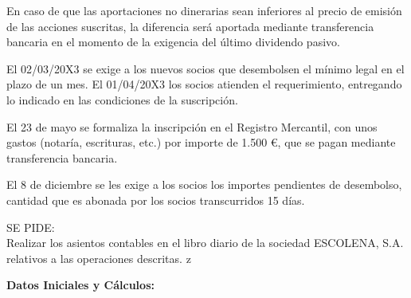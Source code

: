 En caso de que las aportaciones no dinerarias sean inferiores al precio
de emisión de las acciones suscritas, la diferencia será aportada
mediante transferencia bancaria en el momento de la exigencia del último
dividendo pasivo.

El 02/03/20X3 se exige a los nuevos socios que desembolsen el mínimo
legal en el plazo de un mes. El 01/04/20X3 los socios atienden el
requerimiento, entregando lo indicado en las condiciones de la
suscripción.

El 23 de mayo se formaliza la inscripción en el Registro Mercantil, con
unos gastos (notaría, escrituras, etc.) por importe de 1.500 €, que se
pagan mediante transferencia bancaria.

El 8 de diciembre se les exige a los socios los importes pendientes de
desembolso, cantidad que es abonada por los socios transcurridos 15
días.

SE PIDE:\\
Realizar los asientos contables en el libro diario de la sociedad
ESCOLENA, S.A. relativos a las operaciones descritas. z

\textbf{Datos Iniciales y Cálculos:}

